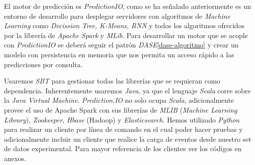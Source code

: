 El motor de predicción es \emph{PredictionIO}, como se ha señalado anteriormente  es un entorno de desarrollo para desplegar servidores con algoritmos de \emph{Machine Learning} como  \emph{Decission Tree, K-Means, RNN} y todos los algoritmos ofrecidos por la librería de \emph{Apache Spark} y \emph{MLib}. Para desarrollar un motor que se acople con \emph{PredictionIO} se deberá seguir el patrón \emph{DASE}\ref{dase-algoritmo} y crear un modelo con persistencia en memoria que nos permita un acceso rápido a las predicciones por consulta.


Usaremos \emph{SBT} para gestionar todas las librerías que se requieran como dependencia. Inherentemente usaremos \emph{Java}, ya que el lenguaje \emph{Scala} corre sobre la \emph{Java Virtual Machine}. \emph{Prediction.IO} no solo ocupa \emph{Scala}, adicionalmente provee el uso de {Apache Spark} con sus librerías de \emph{MLIB} (\emph{Machine Learning Library}), \emph{Zookeeper}, \emph{Hbase} (Hadoop) y \emph{Elasticsearch}. Hemos utilizado \emph{Python} para realizar un cliente por línea de comando en el cual poder hacer pruebas y adicionalmente incluir un cliente que realice la carga de eventos desde nuestro set de datos experimental. Para mayor referencia de los clientes ver los códigos en anexos.











